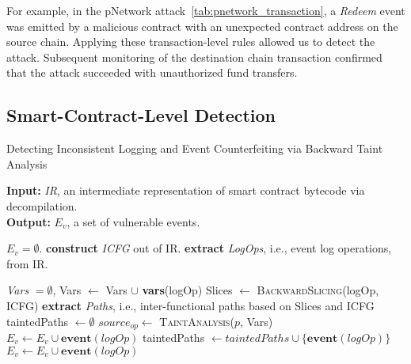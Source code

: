 For example, in the pNetwork attack~\cref{tab:pnetwork_transaction}, a \emph{Redeem} event was emitted by a malicious contract with an unexpected contract address on the source chain. Applying these transaction-level rules allowed us to detect the attack. Subsequent monitoring of the destination chain transaction confirmed that the attack succeeded with unauthorized fund transfers.



\subsection{Smart-Contract-Level Detection}

\begin{algorithm}[t]
\label{algo:bytecode}
  \footnotesize
  \caption{Detecting Inconsistent Logging and Event Counterfeiting via Backward Taint Analysis}
  \textbf{Input:} \textit{IR}, an intermediate representation of smart contract bytecode via decompilation. \\
  \textbf{Output:} $E_v$, a set of vulnerable events. 
  \begin{algorithmic}[1]
    \State  $E_v = \emptyset$. 
    \State \textbf{construct} \textit{ICFG} out of IR.
    \State \textbf{extract} \textit{LogOps}, i.e., event log operations, from IR.  
    
    \State  \textit{Vars} $= \emptyset$, 
      \State Vars $\gets$ Vars $\cup$ \textbf{vars}(logOp)  
      \State Slices $\gets$ \textsc{BackwardSlicing}(logOp, ICFG) 
          \State \textbf{extract} \textit{Paths}, i.e., inter-functional paths based on Slices and ICFG
      \State taintedPaths $\gets \emptyset$   
        \State $source_{op} \gets$ \textsc{TaintAnalysis}($p$, Vars) 
                \State $E_v \gets E_v \cup \textbf{event}(logOp)$ 
            \EndIf
            \State taintedPaths $\gets taintedPaths \cup \{\textbf{event}(logOp)\} $   
        \Else
                 \State $E_v \gets E_v \cup \textbf{event}(logOp)$ 
            \EndIf


\end{algorithmic}
\end{algorithm}
